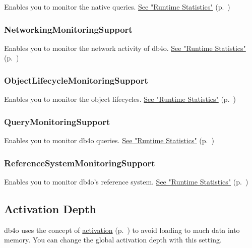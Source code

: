 Enables you to monitor the native queries. \hyperref[ref:advanced-topics-runtime-statistics]{See "Runtime Statistics"} (p.~\pageref{ref:advanced-topics-runtime-statistics})

\subsubsection*{NetworkingMonitoringSupport}

Enables you to monitor the network activity of db4o. \hyperref[ref:advanced-topics-runtime-statistics]{See "Runtime Statistics"} (p.~\pageref{ref:advanced-topics-runtime-statistics})

\subsubsection*{ObjectLifecycleMonitoringSupport}

Enables you to monitor the object lifecycles. \hyperref[ref:advanced-topics-runtime-statistics]{See "Runtime Statistics"} (p.~\pageref{ref:advanced-topics-runtime-statistics})

\subsubsection*{QueryMonitoringSupport}

Enables you to monitor db4o queries. \hyperref[ref:advanced-topics-runtime-statistics]{See "Runtime Statistics"} (p.~\pageref{ref:advanced-topics-runtime-statistics})

\subsubsection*{ReferenceSystemMonitoringSupport}

Enables you to monitor db4o's reference system. \hyperref[ref:advanced-topics-runtime-statistics]{See "Runtime Statistics"} (p.~\pageref{ref:advanced-topics-runtime-statistics})

\subsection{Activation Depth}
\label{ref:configuration-common-activation-depth}

db4o uses the concept of \hyperref[ref:basics-activation]{activation} (p.~\pageref{ref:basics-activation}) to avoid loading to much data into memory. You can change the global activation depth with this setting.

